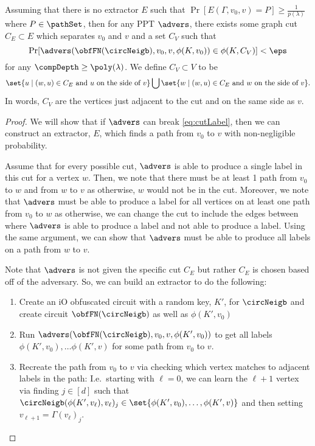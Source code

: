 \begin{lemma}
	\label{lemma:cutBaseCase}
	Assuming that there is no extractor $E$ such that $\Pr[E(\Gamma, v_0, v) = P] \geq \frac{1}{p(\lambda)}$
	where $P \in \pathSet$, then for any PPT $\advers$, there exists some graph cut 
	$C_E \subset E$ which separates $v_0$ and $v$ and a set $C_V$ such that
	\begin{equation}
		\label{eq:cutLabel}
		\Pr[\advers(\obfFN(\circNeigb), v_0, v, \phi(K, v_0)) \in \phi(K, C_V)] < \eps
	\end{equation}
		for any $\compDepth \geq \poly(\lambda)$.
		We define $C_V \subset V$ to be
	\begin{equation*}
		\set{ u \mid (w, u) \in C_E \text{ and } u \text { on the side of } v} \bigcup \set{ w \mid (w, u) \in C_E \text{ and } w \text { on the side of } v}.
	\end{equation*}
	In words, $C_V$ are the vertices just adjacent to the cut and on the same side as $v$.
	\begin{proof}
		We will show that if $\advers$ can break \cref{eq:cutLabel}, then we can construct an extractor,
		$E$, which finds a path from $v_0$ to $v$ with non-negligible probability.

		Assume that for every possible cut, $\advers$ is able to produce a single label in this cut for a vertex $w$.
		Then, we note that there must be at least 1 path from $v_0$ to $w$ and from $w$ to $v$ as otherwise, $w$ would not be in the cut.
		Moreover, we note that $\advers$ must be able to produce a label for all vertices on at least one path
		from $v_0$ to $w$ as otherwise, we can change the cut to include the edges between where
		$\advers$ is able to produce a label and not able to produce a label. Using the same argument,
		we can show that $\advers$ must be able to produce all labels on a path from $w$ to $v$.

		Note that $\advers$ is not given the specific cut $C_E$ but rather $C_E$ is chosen based off of the adversary.
		So, we can build an extractor to do the following:
		\begin{enumerate}
			\item Create an iO obfuscated circuit with a random key, $K'$, for $\circNeigb$ and create circuit $\obfFN(\circNeigb)$
			as well as $\phi(K', v_0)$
			\item Run $\advers(\obfFN(\circNeigb), v_0, v, \phi(K', v_0))$ to get all labels $\phi(K', v_0), \dots \phi(K', v)$
			for some path from $v_0$ to $v$.
			\item Recreate the path from $v_0$ to $v$ via checking which vertex matches to adjacent labels in the path:
			I.e.\ starting with $\ell = 0$, we can learn the $\ell + 1$ vertex via finding $j \in [d]$ such that
			$\circNeigb(\phi(K', v_\ell), v_\ell)_j \in \set{\phi(K', v_0), \dots, \phi(K', v)}$
			 and then setting $v_{\ell + 1} = \Gamma(v_\ell)_j$.
		\end{enumerate}
	\end{proof}
\end{lemma}

